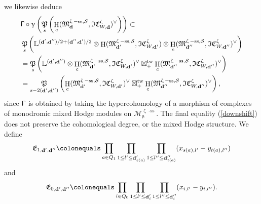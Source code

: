 \documentclass[a4paper,10pt]{amsart}
\renewcommand{\gamma}{\upgamma}
\renewcommand{\zeta}{\upzeta}
\renewcommand{\Gamma}{\Upgamma}
\renewcommand{\mu}{\upmu}
\DeclareMathOperator{\Pf}{\mathfrak{P}}
\newcommand{\LL}{\mathbb{L}}
\newcommand{\SP}{\mathcal{S}}
\newcommand{\Mst}{\mathfrak{M}}
\newcommand{\Msp}{\mathcal{M}}
\newcommand{\ICSt}{\mathfrak{IC}}
\DeclareMathOperator{\sst}{-ss}
\DeclareMathOperator{\tw}{tw}
\DeclareMathOperator{\dd}{\mathbf{d}}
\DeclareMathOperator{\HO}{H}
\begin{document}
we likewise deduce
\begin{align}
\nonumber
&\Gamma\circ\gamma\left(\Pf_s\left(\HO_c(\Mst_{\dd}^{\zeta\sst,\SP},\ICSt_{W,\dd}^{\zeta})^{\vee}\right)\right)\subset
\\\nonumber& \Pf_s\left(\LL^{(\dd',\dd'')/2+(\dd'',\dd')/2}\otimes\HO(\Mst^{\zeta\sst,\SP}_{\dd'},\ICSt_{W,\dd'}^{\zeta})\otimes\HO_c(\Mst^{\zeta\sst,\SP}_{\dd''},\ICSt_{W,\dd''}^{\zeta})^{\vee}\right)\\\nonumber
& =\Pf_s\left(\LL^{(\dd',\dd'')}\otimes \HO_c(\Mst^{\zeta\sst,\SP}_{\dd'},\ICSt_{W,\dd'}^{\zeta})^{\vee}\boxtimes_+^{\tw}\HO_c(\Mst^{\zeta\sst,\SP}_{\dd''},\ICSt_{W,\dd''}^{\zeta})^{\vee}\right)\\\label{downshift}
& =\Pf_{s-2(\dd',\dd'')}\left(\HO_c(\Mst^{\zeta\sst,\SP}_{\dd'},\ICSt_{W,\dd'}^{\zeta})^{\vee}\boxtimes_+^{\tw}\HO_c(\Mst^{\zeta\sst,\SP}_{\dd''},\ICSt_{W,\dd''}^{\zeta})^{\vee}\right),
\end{align}
since $\Gamma$ is obtained by taking the hypercohomology of a morphism of complexes of monodromic mixed Hodge modules on $\Msp_{\mu}^{\zeta\sst}$.  The final equality (\ref{downshift}) does not preserve the cohomological degree, or the mixed Hodge structure.  We define 
\[
\mathfrak{E}_{1,\dd',\dd''}\colonequals \prod_{a\in Q_1}\prod_{1\leq l'\leq \dd'_{s(a)}}\prod_{1\leq l''\leq \dd''_{t(a)}}(x_{s(a),l'}-y_{t(a),l''})
\]
and
\[
\mathfrak{E}_{0,\dd',\dd''}\colonequals \prod_{i\in Q_0}\prod_{1\leq l'\leq \dd'_i}\prod_{1\leq l''\leq \dd''_i}(x_{i,l'}-y_{i,l''}).
\]
\end{document}
